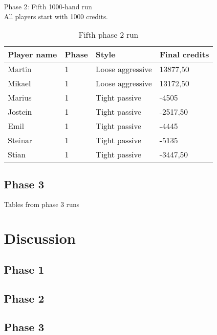 \documentclass[a4paper, 12pt]{article}
\begin{document}
\begin{center}
	{ \Large Phase 2: Fifth 1000-hand run } \\
	All players start with 1000 credits.
\end{center}

\begin{table}[H]
	\begin{center}
		\begin{tabular}{|l|l|l| p{6cm} |}
		\hline
		\textbf{Player name} & \textbf{Phase} & \textbf{Style} & \textbf{Final credits} \\
		\hline
		Martin & 1 & Loose aggressive & 13877,50 \\
		\hline
		Mikael & 1 & Loose aggressive & 13172,50 \\
		\hline
		Marius & 1 & Tight passive & -4505 \\
		\hline
		Jostein & 1 & Tight passive & -2517,50 \\
		\hline
		Emil & 1 & Tight passive & -4445 \\
		\hline
		Steinar & 1 & Tight passive & -5135 \\
		\hline
		Stian & 1 & Tight passive & -3447,50 \\
		\hline
		\end{tabular}
	\end{center}
	\caption{Fifth phase 2 run}
\end{table}

\subsection{Phase 3}
Tables from phase 3 runs

\section{Discussion}

\subsection{Phase 1}

\subsection{Phase 2}

\subsection{Phase 3}
\end{document}
